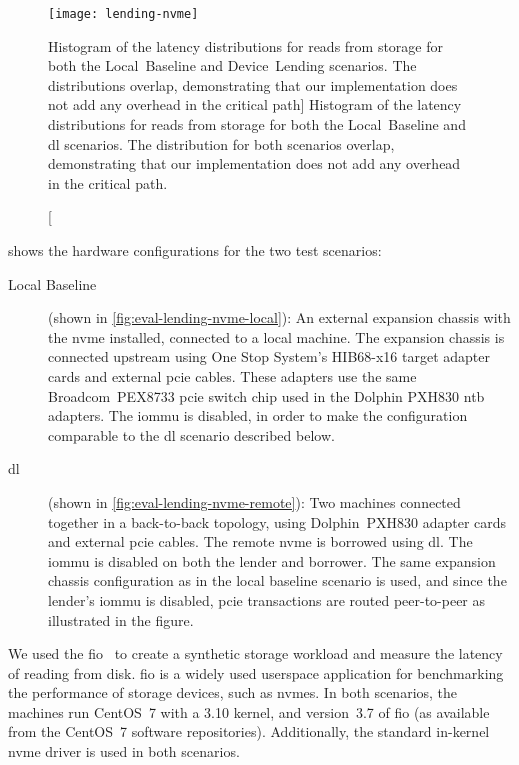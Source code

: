 \begin{figure}
    \centering
    \texttt{[image: lending-nvme]}
    \caption
    [Histogram of the latency distributions for reads from storage for both the Local~Baseline and Device~Lending scenarios. The distributions overlap, demonstrating that our implementation does not add any overhead in the critical  path]
    {Histogram of the latency distributions for reads from storage for both the Local~Baseline and \gls{dl} scenarios. The distribution for both scenarios overlap, demonstrating that our implementation does not add any overhead in the critical  path.}
    \label{fig:eval-lending-nvme-results}
\end{figure}
%
 shows the hardware configurations for the two test scenarios:
\begin{description}
    \item[Local Baseline] (shown in \cref{fig:eval-lending-nvme-local}):
        An external expansion chassis with the \gls{nvme} installed, connected to a local machine. 
        The expansion chassis is connected upstream using One Stop System's HIB68-x16 target adapter cards and external \gls{pcie} cables. 
        These adapters use the same Broadcom~PEX8733 \gls{pcie} switch chip used in the Dolphin PXH830 \gls{ntb} adapters.
        The \gls{iommu} is disabled, in order to make the configuration comparable to the \gls{dl} scenario described below.
        
    \item[\Gls{dl}] (shown in \cref{fig:eval-lending-nvme-remote}):
        Two machines connected together in a back-to-back topology, using Dolphin~PXH830 adapter cards and external \gls{pcie} cables.
        The remote \gls{nvme} is borrowed using \gls{dl}.
        The \gls{iommu} is disabled on both the \gls{lender} and \gls{borrower}.
        The same expansion chassis configuration as in the local baseline scenario is used, and since the \gls{lender}'s \gls{iommu} is disabled, \gls{pcie} transactions are routed peer-to-peer as illustrated in the figure.
\end{description}
%
We used the \gls{fio}~\cite{url:fio} to create a synthetic storage workload and measure the latency of reading from disk.
%
\Gls{fio} is a widely used \gls{userspace} application for benchmarking the performance of storage devices, such as \glspl{nvme}.
%
In both scenarios, the machines run CentOS~7 with a 3.10 kernel, and version~3.7 of \gls{fio} (as available from the CentOS~7 software repositories).
%
Additionally, the standard in-kernel \gls{nvme} driver is used in both scenarios.




